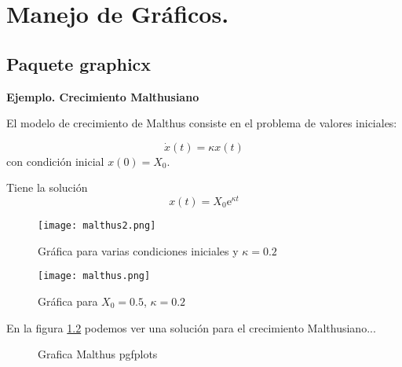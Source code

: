 \chapter{Manejo de Gráficos.}

\section{Paquete {\bf graphicx}}

{\bf Ejemplo. Crecimiento Malthusiano}

El modelo de crecimiento de Malthus consiste en el problema de valores iniciales:

\begin{equation}
    \dot{x}(t)=\kappa x(t)
\end{equation}
con condición inicial $x(0)=X_0$.

 Tiene la solución 
\begin{equation}
    x(t)=X_0\mathrm{e}^{\kappa t}
\end{equation}

\begin{figure}[h!]
    \centering
    \texttt{[image: malthus2.png]}
    \caption{Gráfica para varias condiciones iniciales y $\kappa = 0.2$}
    \label{g2}
\end{figure}

\begin{figure}[h]
    \centering
    \texttt{[image: malthus.png]}
    \caption{Gráfica para $X_0=0.5$, $\kappa = 0.2$}
    \label{g1}
\end{figure}

 En la figura \ref{g1} podemos ver una solución para el crecimiento Malthusiano...


 \begin{figure}[h!]
     \centering
     \caption{Grafica Malthus pgfplots}
     \label{g3}
 \end{figure}

